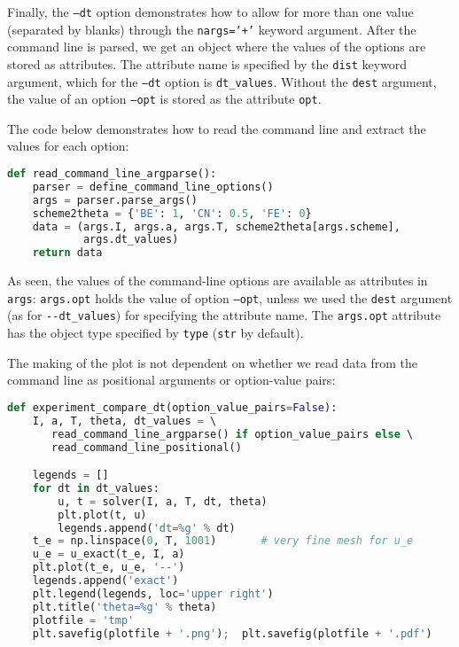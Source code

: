 \documentclass[graybox,sectrefs,envcountresetchap,open=right,final]{svmonodo}
\begin{document}
Finally, the \texttt{--dt} option demonstrates how to allow for more than one
value (separated by blanks) through the \texttt{nargs='+'} keyword argument.
After the command line is parsed, we get an object where the values of
the options are stored as attributes. The attribute name is specified
by the \texttt{dist} keyword argument, which for the \texttt{--dt} option is
\Verb!dt_values!. Without the \texttt{dest} argument, the value of an option \texttt{--opt}
is stored as the attribute \texttt{opt}.

The code below demonstrates how to read the command line and extract
the values for each option:









\begin{lstlisting}[language=python,style=blue1_bluegreen]
def read_command_line_argparse():
    parser = define_command_line_options()
    args = parser.parse_args()
    scheme2theta = {'BE': 1, 'CN': 0.5, 'FE': 0}
    data = (args.I, args.a, args.T, scheme2theta[args.scheme],
            args.dt_values)
    return data

\end{lstlisting}

As seen, the values of the command-line options are available as
attributes in \texttt{args}: \texttt{args.opt} holds the value of option \texttt{--opt}, unless
we used the \texttt{dest} argument (as for \Verb!--dt_values!) for specifying the
attribute name. The \texttt{args.opt} attribute has the object type specified
by \texttt{type} (\texttt{str} by default).

The making of the plot is not dependent on whether we read data from
the command line as positional arguments or option-value pairs:




















\begin{lstlisting}[language=python,style=blue1_bluegreen]
def experiment_compare_dt(option_value_pairs=False):
    I, a, T, theta, dt_values = \ 
       read_command_line_argparse() if option_value_pairs else \ 
       read_command_line_positional()

    legends = []
    for dt in dt_values:
        u, t = solver(I, a, T, dt, theta)
        plt.plot(t, u)
        legends.append('dt=%g' % dt)
    t_e = np.linspace(0, T, 1001)       # very fine mesh for u_e
    u_e = u_exact(t_e, I, a)
    plt.plot(t_e, u_e, '--')
    legends.append('exact')
    plt.legend(legends, loc='upper right')
    plt.title('theta=%g' % theta)
    plotfile = 'tmp'
    plt.savefig(plotfile + '.png');  plt.savefig(plotfile + '.pdf')

\end{lstlisting}
\end{document}
